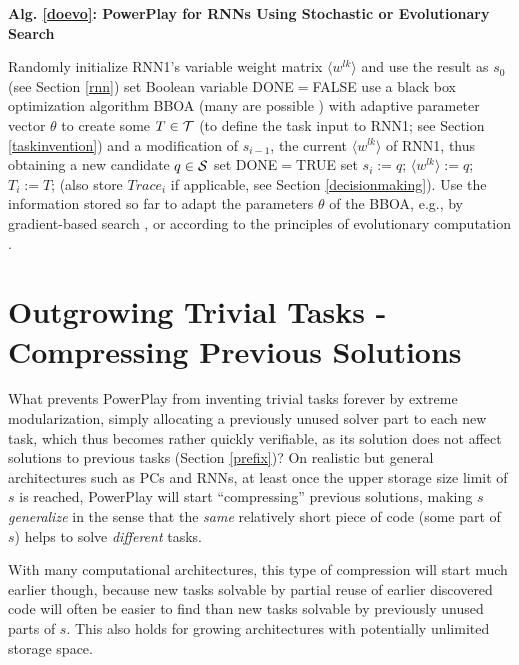 \documentclass{article}
\begin{document}
\begin{algorithm}{\bf Alg. \ref{doevo}: {\sc PowerPlay} for RNNs Using Stochastic or Evolutionary Search}
\label{doevo}
\begin{algorithmic}
\STATE Randomly initialize RNN1's variable weight matrix $\langle w^{lk} \rangle$ and use the result as $s_0$ (see Section \ref{rnn})
\STATE set Boolean variable DONE$=$FALSE
\REPEAT 
\STATE use a black box optimization algorithm BBOA (many are possible
 \cite{Rechenberg:71,Gomez:08jmlr,wierstraCEC08,sehnke2009parameter}) with adaptive parameter vector $\theta$  to create some $T \in \cal T$ (to define the task input to RNN1; see Section
\ref{taskinvention}) and a modification of $s_{i-1}$, the current $\langle w^{lk} \rangle$ of RNN1, thus obtaining a new candidate $q \in \cal S$
\STATE set DONE$=$TRUE
\ENDIF
{}
\STATE set $s_i := q$; $\langle w^{lk} \rangle := q$; $T_i := T$; (also store $Trace_i$ if applicable, see Section  \ref{decisionmaking}). Use the information stored so far to adapt the parameters $\theta$ of the BBOA, e.g., by gradient-based search  \cite{wierstraCEC08,sehnke2009parameter},  or according to the principles of evolutionary computation \cite{Rechenberg:71,Gomez:08jmlr,wierstraCEC08}.
\ENDFOR
\end{algorithmic}
\end{algorithm}


\section{Outgrowing Trivial Tasks - Compressing Previous Solutions}
\label{compressing}

What prevents {\sc PowerPlay} from inventing trivial  tasks forever by extreme modularization, simply allocating a previously unused solver part to each new task, which thus becomes rather quickly verifiable, as its solution does not affect solutions to previous tasks (Section  \ref{prefix})?
On realistic but general architectures such as PCs and RNNs,
at least once the upper storage size limit of $s$ is reached, {\sc PowerPlay} will 
start ``compressing'' previous solutions, making $s$ {\em generalize} in the sense 
that the {\em same} relatively short piece of code (some part of $s$) helps to solve {\em different}
tasks. 

With many computational architectures,
this type of compression 
will start much earlier though, because new tasks solvable
by partial reuse of earlier discovered code will often be easier to find than new tasks 
solvable by previously unused parts of $s$. This also holds for
growing architectures with potentially unlimited storage space.
\end{document}
